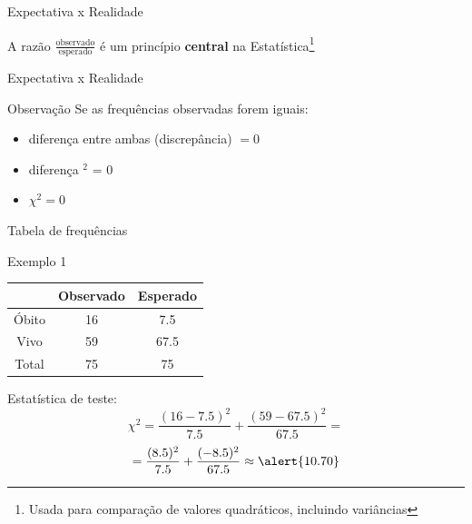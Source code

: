 \documentclass{beamer}
\begin{document}
\begin{frame}{\small Expectativa x Realidade}
  \begin{center}
    \small
    A razão $\frac{\text{observado}}{\text{esperado}}$ é um princípio {\bf central} na Estatística\footnote{\scriptsize Usada para comparação de valores quadráticos, incluindo variâncias}
  \end{center}
\end{frame}

\begin{frame}{\small Expectativa x Realidade}
  \begin{block}{Observação}
    Se as frequências observadas forem iguais:
    \begin{itemize}
      \small
    \item diferença entre ambas (discrepância) $= 0$
    \item diferença $^2$ = 0
    \item $\chi^2 = 0$
    \end{itemize}
    \bigskip
  \end{block}
\end{frame}

\begin{frame}{\scriptsize Tabela de frequências}
  \begin{exampleblock}{Exemplo 1}
    \footnotesize
    \begin{tabular}{c|c|c}
      & Observado & Esperado\\
      \hline
      Óbito & 16 & 7.5 \\
      \hline
      Vivo & 59 & 67.5 \\
      \hline
      Total & 75 & 75\\
    \end{tabular}
  \end{exampleblock}

  Estatística de teste:
  \small
  \begin{displaymath}
    \chi^2 = \frac{(16 - 7.5)^2}{7.5} + \frac{(59 - 67.5)^2}{67.5} =
  \end{displaymath}
  \begin{displaymath}
    = \frac{(8.5)^2}{7.5} + \frac{(-8.5)^2}{67.5} \approx \alert{10.70}
  \end{displaymath}
\end{frame}
\end{document}
